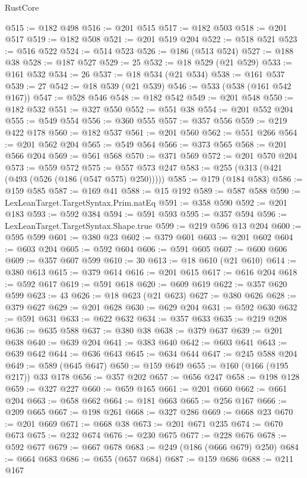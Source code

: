 \begin{lexlean}{RustCore}
\begin{coremodule}
@515 := @182 @498
@516 := @201 @515
@517 := @182 @503
@518 := @201 @517
@519 := @182 @508
@521 := @201 @519 @204
@522 := @518 @521
@523 := @516 @522
@524 := @514 @523
@526 := @186 (@513 @524)
@527 := @188 @38
@528 := @187 @527
@529 := 25
@532 := @18 @529 (@21 @529)
@533 := @161 @532
@534 := 26
@537 := @18 @534 (@21 @534)
@538 := @161 @537
@539 := 27
@542 := @18 @539 (@21 @539)
@546 := @533 (@538 (@161 @542 @167))
@547 := @528 @546
@548 := @182 @542
@549 := @201 @548
@550 := @182 @532
@551 := @327 @550
@552 := @551 @38
@554 := @201 @552 @204
@555 := @549 @554
@556 := @360 @555
@557 := @357 @556
@559 := @219 @422 @178
@560 := @182 @537
@561 := @201 @560
@562 := @551 @266
@564 := @201 @562 @204
@565 := @549 @564
@566 := @373 @565
@568 := @201 @566 @204
@569 := @561 @568
@570 := @371 @569
@572 := @201 @570 @204
@573 := @559 @572
@575 := @557 @573 @247
@583 := @255 (@313 (@421 (@493 (@526 (@186 (@547 @575) @250)))))
@585 := @179 (@184 @583)
@586 := @159 @585
@587 := @169 @41
@588 := @15 @192
@589 := @587 @588
@590 := LexLeanTarget.TargetSyntax.Prim.natEq
@591 := @358 @590
@592 := @201 @183
@593 := @592 @384
@594 := @591 @593
@595 := @357 @594
@596 := LexLeanTarget.TargetSyntax.Shape.true
@599 := @219 @596 @13 @204
@600 := @595 @599
@601 := @380 @23
@602 := @379 @601
@603 := @201 @602
@604 := @603 @204
@605 := @592 @604
@606 := @591 @605
@607 := @600 @606
@609 := @357 @607 @599
@610 := 30
@613 := @18 @610 (@21 @610)
@614 := @380 @613
@615 := @379 @614
@616 := @201 @615
@617 := @616 @204
@618 := @592 @617
@619 := @591 @618
@620 := @609 @619
@622 := @357 @620 @599
@623 := 43
@626 := @18 @623 (@21 @623)
@627 := @380 @626
@628 := @379 @627
@629 := @201 @628
@630 := @629 @204
@631 := @592 @630
@632 := @591 @631
@633 := @622 @632
@634 := @357 @633
@635 := @219 @208
@636 := @635 @588
@637 := @380 @38
@638 := @379 @637
@639 := @201 @638
@640 := @639 @204
@641 := @383 @640
@642 := @603 @641
@643 := @639 @642
@644 := @636 @643
@645 := @634 @644
@647 := @245 @588 @204
@649 := @589 (@645 @647)
@650 := @159 @649
@655 := @160 (@166 (@195 @217)) @33 @178
@656 := @357 @202
@657 := @656 @247
@658 := @198 @128
@659 := @327 @227
@660 := @659 @165
@661 := @201 @660
@662 := @661 @204
@663 := @658 @662
@664 := @181 @663
@665 := @256 @167
@666 := @209 @665
@667 := @198 @261
@668 := @327 @286
@669 := @668 @23
@670 := @201 @669
@671 := @668 @38
@673 := @201 @671 @235
@674 := @670 @673
@675 := @232 @674
@676 := @230 @675
@677 := @228 @676
@678 := @592 @677
@679 := @667 @678
@683 := @249 (@186 (@666 @679) @250)
@684 := @664 @683
@686 := @655 (@657 @684)
@687 := @159 @686
@688 := @211 @167

\end{coremodule}
\end{lexlean}
